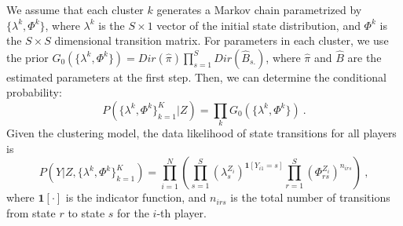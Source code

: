 We assume that each cluster $k$ generates a Markov chain parametrized by $\{\lambda^k, \Phi^k\}$, 
where $\lambda^k$ is the $S\times 1$ vector of the initial state distribution, 
and $\Phi^k$ is the $S \times S$ dimensional transition matrix. For parameters in each cluster, 
we use the prior $G_0(\{\lambda^k, \Phi^k\}) = Dir(\hat\pi) \prod_{s=1}^S Dir (\hat B_{s.})$,
where $\hat\pi$ and $\hat B$ are the estimated parameters at the first step. 
Then, we can determine the conditional probability:  
\begin{equation}
\label{eq:condi}
  P(\{\lambda^k, \Phi^k \}_{k=1}^K | Z ) 
= \prod_k G_0(\{\lambda^k, \Phi^k\})~.
\end{equation}
Given the clustering model, the data likelihood of state transitions for all players is
\begin{equation}
\label{eq:likeli}
  P(Y| Z, \{\lambda^k, \Phi^k \}_{k=1}^K) 
= \prod_{i=1}^N \left( \prod_{s=1}^S (\lambda_s^{Z_i})^{\mathbf{1}[Y_{i1} = s]} \prod_{r=1}^S \left(\Phi_{rs}^{Z_i}\right)^{n_{irs}} \right)~,
\end{equation}
where $\mathbf{1} [\cdot]$ is the indicator function, and $n_{irs}$ is the total number of transitions from state $r$ to state $s$ for the $i$-th player.


